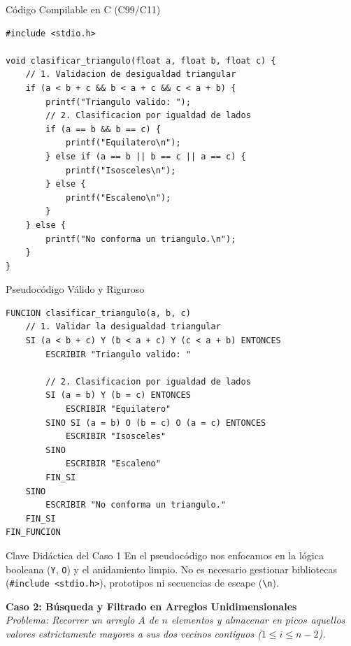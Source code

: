\documentclass[11pt,letterpaper]{article}
\begin{document}
\begin{cbox}{Código Compilable en C (C99/C11)}
\begin{lstlisting}[style=customc]
#include <stdio.h>

void clasificar_triangulo(float a, float b, float c) {
    // 1. Validacion de desigualdad triangular
    if (a < b + c && b < a + c && c < a + b) {
        printf("Triangulo valido: ");
        // 2. Clasificacion por igualdad de lados
        if (a == b && b == c) {
            printf("Equilatero\n");
        } else if (a == b || b == c || a == c) {
            printf("Isosceles\n");
        } else {
            printf("Escaleno\n");
        }
    } else {
        printf("No conforma un triangulo.\n");
    }
}
\end{lstlisting}
\end{cbox}

\vspace{0.25cm}

\begin{pseudobox}{Pseudocódigo Válido y Riguroso}
\begin{lstlisting}[style=pseudocodigo]
FUNCION clasificar_triangulo(a, b, c)
    // 1. Validar la desigualdad triangular
    SI (a < b + c) Y (b < a + c) Y (c < a + b) ENTONCES
        ESCRIBIR "Triangulo valido: "
        
        // 2. Clasificacion por igualdad de lados
        SI (a = b) Y (b = c) ENTONCES
            ESCRIBIR "Equilatero"
        SINO SI (a = b) O (b = c) O (a = c) ENTONCES
            ESCRIBIR "Isosceles"
        SINO
            ESCRIBIR "Escaleno"
        FIN_SI
    SINO
        ESCRIBIR "No conforma un triangulo."
    FIN_SI
FIN_FUNCION
\end{lstlisting}
\end{pseudobox}

\vspace{0.2cm}
\begin{conceptbox}{Clave Didáctica del Caso 1}
\small
En el pseudocódigo nos enfocamos en la lógica booleana (\texttt{Y}, \texttt{O}) y el anidamiento limpio. No es necesario gestionar bibliotecas (\texttt{\#include <stdio.h>}), prototipos ni secuencias de escape (\texttt{\textbackslash n}).
\end{conceptbox}

\newpage
\noindent \textbf{Caso 2: Búsqueda y Filtrado en Arreglos Unidimensionales} \\
\small \textit{Problema: Recorrer un arreglo $A$ de $n$ elementos y almacenar en $picos$ aquellos valores estrictamente mayores a sus dos vecinos contiguos ($1 \le i \le n-2$).}
\vspace{0.2cm}
\end{document}
